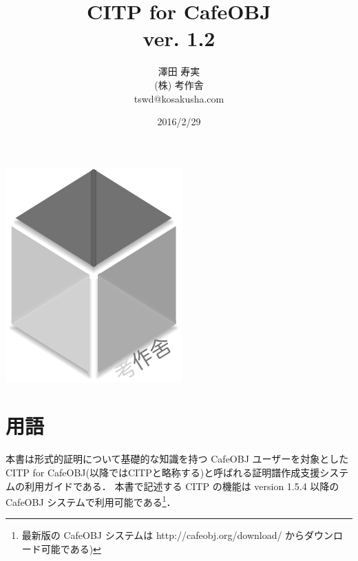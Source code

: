 \documentclass[a4paper,oneside,10pt,here]{memoir}
\begin{document}
\tightlists
\sloppy
\raggedbottom
{}
\frontmatter
\pagestyle{empty}
\title{CITP for CafeOBJ \\
ver. 1.2}
\vfill
\author{澤田 寿実\\
  (株) 考作舎\\
  tswd@kosakusha.com}
\date{2016/2/29}
\maketitle
\vfill
\begin{center}
\includegraphics[scale=0.4]{../etc/kosakusha-logo-gray.png}
\end{center}
\vfill
\thispagestyle{empty}
\newpage
\mainmatter
\pagestyle{plain}
\tableofcontents
\EnableBpAbbreviations
\newpage
\chapter{用語}\label{sec:terms}
本書は形式的証明について基礎的な知識を持つ CafeOBJ ユーザーを対象とした
CITP for CafeOBJ(以降ではCITPと略称する)と呼ばれる証明譜作成支援システムの利用ガイドである．
本書で記述する CITP の機能は version 1.5.4 以降のCafeOBJ システムで利用可能である\footnote{最新版の CafeOBJ システムは http://cafeobj.org/download/ からダウンロード可能である)}．
\end{document}
